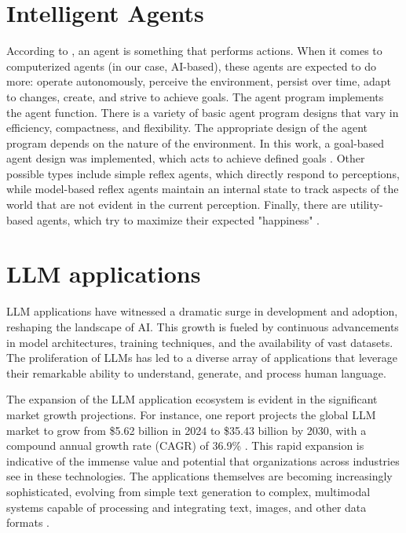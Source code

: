     \section{Intelligent Agents}         
        According to \citet{Russell2020}, an agent is something that performs actions. When it comes to computerized agents (in our case, AI-based), these agents are expected to do more: operate autonomously, perceive the environment, persist over time, adapt to changes, create, and strive to achieve goals.
        The agent program implements the agent function.
        There is a variety of basic agent program designs that vary in efficiency, compactness, and flexibility. The appropriate design of the agent program depends on the nature of the environment. In this work, a goal-based agent design was implemented, which acts to achieve defined goals \citep{Russell2020}.
        Other possible types include simple reflex agents, which directly respond to perceptions, while model-based reflex agents maintain an internal state to track aspects of the world that are not evident in the current perception. Finally, there are utility-based agents, which try to maximize their expected "happiness" \citep{Russell2020}.

    \section{LLM applications}


        LLM applications have witnessed a dramatic surge in development and adoption, reshaping the landscape of AI. This growth is fueled by continuous advancements in model architectures, training techniques, and the availability of vast datasets. The proliferation of LLMs has led to a diverse array of applications that leverage their remarkable ability to understand, generate, and process human language.

        The expansion of the LLM application ecosystem is evident in the significant market growth projections. For instance, one report projects the global LLM market to grow from \$5.62 billion in 2024 to \$35.43 billion by 2030, with a compound annual growth rate (CAGR) of 36.9\% \citep{GrandViewResearch2025}. This rapid expansion is indicative of the immense value and potential that organizations across industries see in these technologies. The applications themselves are becoming increasingly sophisticated, evolving from simple text generation to complex, multimodal systems capable of processing and integrating text, images, and other data formats \citep{Kaddour2023}.
        
